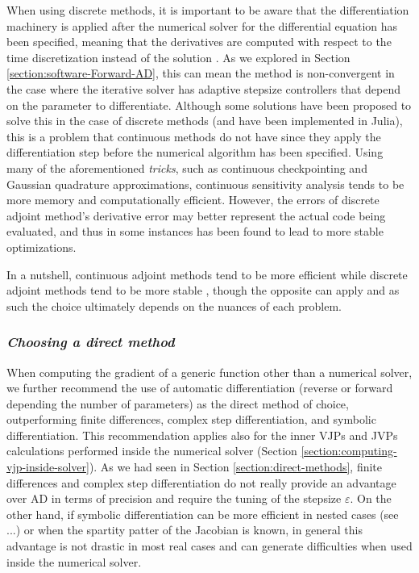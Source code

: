 When using discrete methods, it is important to be aware that the differentiation machinery is applied after the numerical solver for the differential equation has been specified, meaning that the derivatives are computed with respect to the time discretization instead of the solution \cite{Eberhard_Bischof_1996}.
As we explored in Section \ref{section:software-Forward-AD}, this can mean the method is non-convergent in the case where the iterative solver has adaptive stepsize controllers that depend on the parameter to differentiate.
Although some solutions have been proposed to solve this in the case of discrete methods \cite{Eberhard_Bischof_1996} (and have been implemented in Julia), this is a problem that continuous methods do not have since they apply the differentiation step before the numerical algorithm has been specified. 
Using many of the aforementioned \emph{tricks}, such as continuous checkpointing and Gaussian quadrature approximations, continuous sensitivity analysis tends to be more memory and computationally efficient. 
However, the errors of discrete adjoint method's derivative error may better represent the actual code being evaluated, and thus in some instances has been found to lead to more stable optimizations. 

In a nutshell, continuous adjoint methods tend to be more efficient while discrete adjoint methods tend to be more stable \cite{rackauckas2020universal}, though the opposite can apply and as such the choice ultimately depends on the nuances of each problem.



\subsubsection*{\textit{Choosing a direct method}}

When computing the gradient of a generic function other than a numerical solver, we further recommend the use of automatic differentiation (reverse or forward depending the number of parameters) as the direct method of choice, outperforming finite differences, complex step differentiation, and symbolic differentiation. 
This recommendation applies also for the inner VJPs and JVPs calculations performed inside the numerical solver (Section \ref{section:computing-vjp-inside-solver}).
As we had seen in Section \ref{section:direct-methods}, finite differences and complex step differentiation do not really provide an advantage over AD in terms of precision and require the tuning of the stepsize $\varepsilon$. 
On the other hand, if symbolic differentiation can be more efficient in nested cases (see ...) or when the spartity patter of the Jacobian is known, in general this advantage is not drastic in most real cases and can generate difficulties when used inside the numerical solver. 

